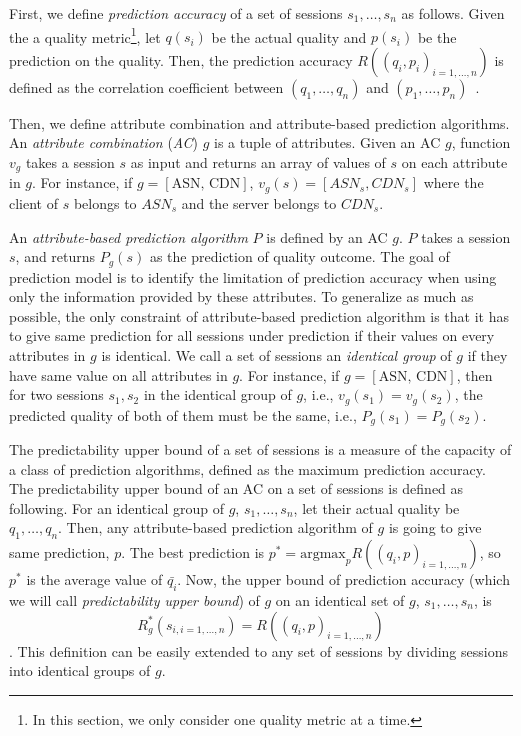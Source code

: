 \label{subsec:upperbound}

First, we define {\it prediction accuracy} of a set of sessions $s_1,\dots,s_n$ as follows. Given the a quality metric\footnote{In this section, we only consider one quality metric at a time.}, let $q(s_i)$ be the actual quality and $p(s_i)$ be the prediction on the quality. Then, the prediction accuracy $R((q_i,p_i)_{i=1,\dots,n})$ is defined as the correlation coefficient between $(q_1,\dots,q_n)$ and $(p_1,\dots,p_n)$~\cite{?}.

Then, we define attribute combination and attribute-based prediction algorithms.
An {\it attribute combination} ({\it AC}) $g$ is a tuple of attributes. Given an AC $g$, function $v_g$ takes a session $s$ as input and returns an array of values of $s$ on each attribute in $g$. For instance, if $g=[\textrm{ASN, CDN}]$, $v_g(s)=[ASN_s,CDN_s]$ where the client of $s$ belongs to $ASN_s$ and the server belongs to $CDN_s$.

An {\it attribute-based prediction algorithm} $P$ is defined by an AC $g$. $P$ takes a session $s$, and returns $P_g(s)$ as the prediction of quality outcome. 
The goal of prediction model is to identify the limitation of prediction accuracy when using only the information provided by these attributes. To generalize as much as possible, the only constraint of attribute-based prediction algorithm is that it has to give same prediction for all sessions under prediction if their values on every attributes in $g$ is identical. We call a set of sessions an {\it identical group} of $g$ if they have same value on all attributes in $g$. For instance, if $g=[\textrm{ASN, CDN}]$, then for two sessions $s_1,s_2$ in the identical group of $g$, i.e., $v_g(s_1)=v_g(s_2)$, the predicted quality of both of them must be the same, i.e., $P_g(s_1)=P_g(s_2)$. 


The predictability upper bound of a set of sessions is a measure of the capacity of a class of prediction algorithms, defined as the maximum prediction accuracy. The predictability upper bound of an AC on a set of sessions is defined as following. 
For an identical group of $g$, $s_1,\dots,s_n$, let their actual quality be $q_1,\dots,q_n$. Then, any attribute-based prediction algorithm of $g$ is going to give same prediction, $p$. The best prediction is $p^*=\textrm{argmax}_p R((q_i,p)_{i=1,\dots,n})$, so $p^*$ is the average value of $\bar{q_i}$. Now, the upper bound of prediction accuracy (which we will call {\it predictability upper bound}) of $g$ on an identical set of $g$, $s_1,\dots,s_n$, is $$R^*_g(s_{i,i=1,\dots,n})=R((q_i,p)_{i=1,\dots,n})$$. This definition can be easily extended to any set of sessions by dividing sessions into identical groups of $g$. 

